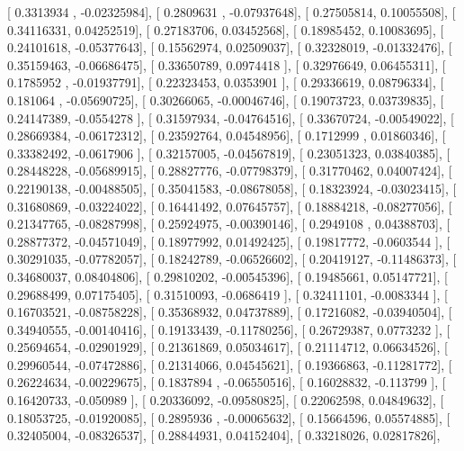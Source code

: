 \documentclass{article}
\begin{document}
       [ 0.3313934 , -0.02325984],
       [ 0.2809631 , -0.07937648],
       [ 0.27505814,  0.10055508],
       [ 0.34116331,  0.04252519],
       [ 0.27183706,  0.03452568],
       [ 0.18985452,  0.10083695],
       [ 0.24101618, -0.05377643],
       [ 0.15562974,  0.02509037],
       [ 0.32328019, -0.01332476],
       [ 0.35159463, -0.06686475],
       [ 0.33650789,  0.0974418 ],
       [ 0.32976649,  0.06455311],
       [ 0.1785952 , -0.01937791],
       [ 0.22323453,  0.0353901 ],
       [ 0.29336619,  0.08796334],
       [ 0.181064  , -0.05690725],
       [ 0.30266065, -0.00046746],
       [ 0.19073723,  0.03739835],
       [ 0.24147389, -0.0554278 ],
       [ 0.31597934, -0.04764516],
       [ 0.33670724, -0.00549022],
       [ 0.28669384, -0.06172312],
       [ 0.23592764,  0.04548956],
       [ 0.1712999 ,  0.01860346],
       [ 0.33382492, -0.0617906 ],
       [ 0.32157005, -0.04567819],
       [ 0.23051323,  0.03840385],
       [ 0.28448228, -0.05689915],
       [ 0.28827776, -0.07798379],
       [ 0.31770462,  0.04007424],
       [ 0.22190138, -0.00488505],
       [ 0.35041583, -0.08678058],
       [ 0.18323924, -0.03023415],
       [ 0.31680869, -0.03224022],
       [ 0.16441492,  0.07645757],
       [ 0.18884218, -0.08277056],
       [ 0.21347765, -0.08287998],
       [ 0.25924975, -0.00390146],
       [ 0.2949108 ,  0.04388703],
       [ 0.28877372, -0.04571049],
       [ 0.18977992,  0.01492425],
       [ 0.19817772, -0.0603544 ],
       [ 0.30291035, -0.07782057],
       [ 0.18242789, -0.06526602],
       [ 0.20419127, -0.11486373],
       [ 0.34680037,  0.08404806],
       [ 0.29810202, -0.00545396],
       [ 0.19485661,  0.05147721],
       [ 0.29688499,  0.07175405],
       [ 0.31510093, -0.0686419 ],
       [ 0.32411101, -0.0083344 ],
       [ 0.16703521, -0.08758228],
       [ 0.35368932,  0.04737889],
       [ 0.17216082, -0.03940504],
       [ 0.34940555, -0.00140416],
       [ 0.19133439, -0.11780256],
       [ 0.26729387,  0.0773232 ],
       [ 0.25694654, -0.02901929],
       [ 0.21361869,  0.05034617],
       [ 0.21114712,  0.06634526],
       [ 0.29960544, -0.07472886],
       [ 0.21314066,  0.04545621],
       [ 0.19366863, -0.11281772],
       [ 0.26224634, -0.00229675],
       [ 0.1837894 , -0.06550516],
       [ 0.16028832, -0.113799  ],
       [ 0.16420733, -0.050989  ],
       [ 0.20336092, -0.09580825],
       [ 0.22062598,  0.04849632],
       [ 0.18053725, -0.01920085],
       [ 0.2895936 , -0.00065632],
       [ 0.15664596,  0.05574885],
       [ 0.32405004, -0.08326537],
       [ 0.28844931,  0.04152404],
       [ 0.33218026,  0.02817826],
\end{document}
